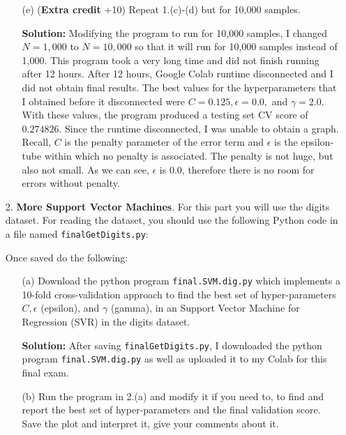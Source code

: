 \documentclass[a4paper]{article}
\begin{document}
\begin{enumerate}
\begin{itemize}
        \item[(e)] (\textbf{Extra credit} +10) Repeat 1.(c)-(d) but for 10,000 samples.
         
        \textbf{Solution:} Modifying the program to run for 10,000 samples, I changed $N = 1,000$ 
        to $N = 10,000$ so that it will run for 10,000 samples instead of 1,000.  This program took 
        a very long time and did not finish running after 12 hours.  After 12 hours, Google Colab 
        runtime disconnected and I did not obtain final results.  The best values for the 
        hyperparameters that I obtained before it disconnected were $C = 0.125, \epsilon = 0.0,$ and 
        $\gamma = 2.0$.  With these values, the program produced a testing set CV score of $0.274826$.  
        Since the runtime disconnected, I was unable to obtain a graph.  Recall, $C$ is the penalty 
        parameter of the error term and $\epsilon$ is the epsilon-tube within which no penalty is 
        associated.  The penalty is not huge, but also not small.  As we can see, $\epsilon$ is 0.0, 
        therefore there is no room for errors without penalty.
    \end{itemize} 


    
    \item[2.] \textbf{More Support Vector Machines}.  For this part you will use the digits 
    dataset.  For reading the dataset, you should use the following Python code in a file named 
    \verb|finalGetDigits.py|:
    
    Once saved do the following:
    \begin{itemize}
        \item[(a)] Download the python program \verb|final.SVM.dig.py| which implements a 10-fold 
        cross-validation approach to find the best set of hyper-parameters $C, \epsilon$ (epsilon), 
        and $\gamma$ (gamma), in an Support Vector Machine for Regression (SVR) in the digits 
        dataset.

        \textbf{Solution:} After saving \verb|finalGetDigits.py|, I downloaded the python program 
        \verb|final.SVM.dig.py| as well as uploaded it to my Colab for this final exam.

        \item[(b)] Run the program in 2.(a) and modify it if you need to, to find and report the 
        best set of hyper-parameters and the final validation score.  Save the plot and interpret 
        it, give your comments about it.
        

\end{itemize}
\end{enumerate}
\end{document}
